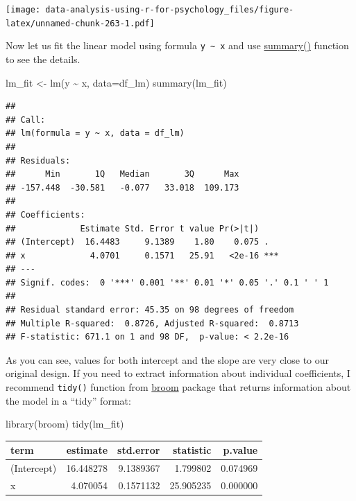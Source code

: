 \documentclass[
]{book}
\newenvironment{Shaded}{\begin{snugshade}}{\end{snugshade}}
\newcommand{\AttributeTok}[1]{\textcolor[rgb]{0.77,0.63,0.00}{#1}}
\newcommand{\FunctionTok}[1]{\textcolor[rgb]{0.00,0.00,0.00}{#1}}
\newcommand{\NormalTok}[1]{#1}
\newcommand{\OtherTok}[1]{\textcolor[rgb]{0.56,0.35,0.01}{#1}}
\newcommand{\SpecialCharTok}[1]{\textcolor[rgb]{0.00,0.00,0.00}{#1}}
\begin{document}
\texttt{[image: data-analysis-using-r-for-psychology\_files/figure-latex/unnamed-chunk-263-1.pdf]}

Now let us fit the linear model using formula \texttt{y\ \textasciitilde{}\ x} and use \href{https://stat.ethz.ch/R-manual/R-devel/library/stats/html/summary.lm.html}{summary()} function to see the details.

\begin{Shaded}
\begin{Highlighting}[]
\NormalTok{lm\_fit }\OtherTok{\textless{}{-}} \FunctionTok{lm}\NormalTok{(y }\SpecialCharTok{\textasciitilde{}}\NormalTok{ x, }\AttributeTok{data=}\NormalTok{df\_lm)}
\FunctionTok{summary}\NormalTok{(lm\_fit)}
\end{Highlighting}
\end{Shaded}

\begin{verbatim}
## 
## Call:
## lm(formula = y ~ x, data = df_lm)
## 
## Residuals:
##      Min       1Q   Median       3Q      Max 
## -157.448  -30.581   -0.077   33.018  109.173 
## 
## Coefficients:
##             Estimate Std. Error t value Pr(>|t|)    
## (Intercept)  16.4483     9.1389    1.80    0.075 .  
## x             4.0701     0.1571   25.91   <2e-16 ***
## ---
## Signif. codes:  0 '***' 0.001 '**' 0.01 '*' 0.05 '.' 0.1 ' ' 1
## 
## Residual standard error: 45.35 on 98 degrees of freedom
## Multiple R-squared:  0.8726, Adjusted R-squared:  0.8713 
## F-statistic: 671.1 on 1 and 98 DF,  p-value: < 2.2e-16
\end{verbatim}

As you can see, values for both intercept and the slope are very close to our original design. If you need to extract information about individual coefficients, I recommend \texttt{tidy()} function from \href{https://github.com/tidymodels/broom}{broom} package that returns information about the model in a ``tidy'' format:

\begin{Shaded}
\begin{Highlighting}[]
\FunctionTok{library}\NormalTok{(broom)}
\FunctionTok{tidy}\NormalTok{(lm\_fit)}
\end{Highlighting}
\end{Shaded}

\begin{tabular}{l|r|r|r|r}
\hline
term & estimate & std.error & statistic & p.value\\
\hline
(Intercept) & 16.448278 & 9.1389367 & 1.799802 & 0.074969\\
\hline
x & 4.070054 & 0.1571132 & 25.905235 & 0.000000\\
\hline
\end{tabular}
\end{document}
